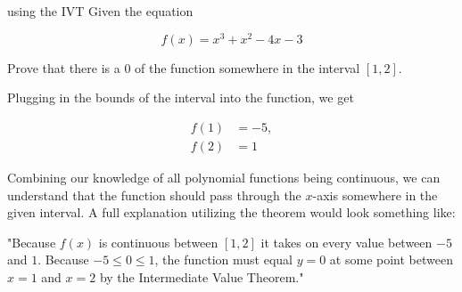 \begin{example}{using the IVT}
    Given the equation
    
    \[ f \left( x \right) = x^3 + x^2 - 4x - 3 \]
    
    Prove that there is a \( 0 \) of the function somewhere in the interval \( [1, 2] \).
    
    \vspace{0.5cm}
    
    Plugging in the bounds of the interval into the function, we get
    
    \begin{align*}
        f \left( 1 \right) &= -5, \\
        f \left( 2 \right) &= 1
    \end{align*}
    
    Combining our knowledge of all polynomial functions being continuous, we can understand that the function should pass through the \( x \)-axis somewhere in the given interval. A full explanation utilizing the theorem would look something like:
    
    \vspace{0.3cm}
    
    "Because \( f \left( x \right) \) is continuous between \( [1, 2] \) it takes on every value between \( -5 \) and \( 1 \). Because \( -5 \le 0 \le 1 \), the function must equal \( y = 0 \) at some point between \( x = 1 \) and \( x = 2 \) by the Intermediate Value Theorem."
\end{example}
